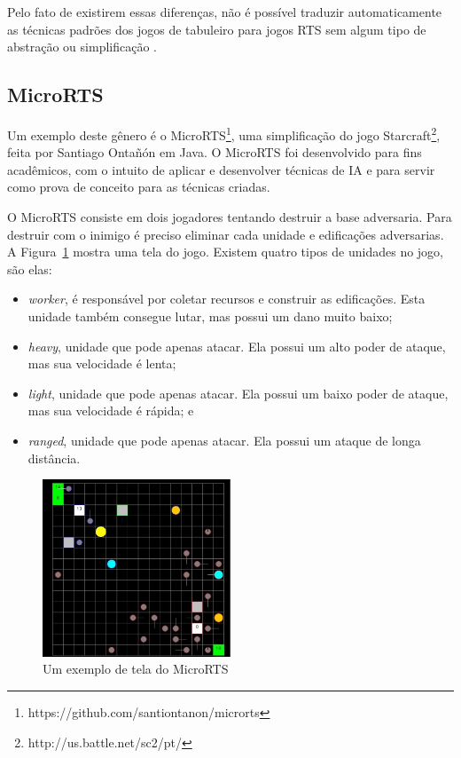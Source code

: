  
 Pelo fato de existirem essas diferenças, não é possível traduzir automaticamente as técnicas padrões dos jogos de tabuleiro para jogos RTS sem algum tipo de abstração ou simplificação \cite{ontanon2013survey}.
 
\subsection{MicroRTS}  
 
 Um exemplo deste gênero é o MicroRTS\footnote{https://github.com/santiontanon/microrts}, uma simplificação do jogo Starcraft\footnote{http://us.battle.net/sc2/pt/}, feita por Santiago Ontañón \cite{ontanon2013combinatorial} em Java. O MicroRTS foi desenvolvido para fins acadêmicos, com o intuito de aplicar e desenvolver técnicas de IA e para servir como prova de conceito para as técnicas criadas.
  
O MicroRTS consiste em dois jogadores tentando destruir a base adversaria. Para destruir com o inimigo é preciso eliminar cada unidade e edificações adversarias. A Figura~\ref{fig:microrts} mostra uma tela do jogo. Existem quatro tipos de unidades no jogo, são elas:
  
\begin{itemize}
 	\item \textit{worker}, é responsável por coletar recursos e construir as edificações. Esta unidade também consegue lutar, mas possui um dano muito baixo;
 	\item \textit{heavy}, unidade que pode apenas atacar. Ela possui um alto poder de ataque, mas sua velocidade é lenta;
 	\item \textit{light}, unidade que pode apenas atacar. Ela possui um baixo poder de ataque, mas sua velocidade é rápida; e
 	\item \textit{ranged}, unidade que pode apenas atacar. Ela possui um ataque de longa distância. 
\end{itemize} 

\begin{figure}[ht]
	\centering
	\includegraphics[width=0.5\textwidth]{fig/microrts.pdf}
	\caption{Um exemplo de tela do MicroRTS}
	\label{fig:microrts}
\end{figure} 
 
